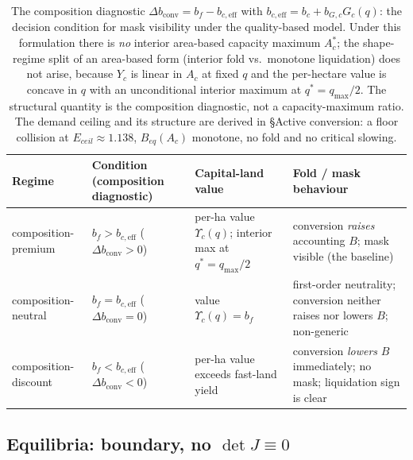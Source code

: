 \documentclass[11pt]{article}
\begin{document}
\begin{table}[htbp]
\centering
\small
\begin{tabularx}{\textwidth}{>{\raggedright\arraybackslash}X>{\raggedright\arraybackslash}X>{\raggedright\arraybackslash}X>{\raggedright\arraybackslash}X}
\toprule
Regime & Condition (composition diagnostic) & Capital-land value & Fold / mask behaviour \\
\midrule
composition-premium & $b_f>b_{c,\mathrm{eff}}$ ($\Delta b_{\mathrm{conv}}>0$) & per-ha value $\Upsilon_c(q)$; interior max at $q^*=q_{\max}/2$ & conversion \emph{raises} accounting $B$; mask visible (the baseline) \\
composition-neutral & $b_f=b_{c,\mathrm{eff}}$ ($\Delta b_{\mathrm{conv}}=0$) & value $\Upsilon_c(q)=b_f$ & first-order neutrality; conversion neither raises nor lowers $B$; non-generic \\
composition-discount & $b_f<b_{c,\mathrm{eff}}$ ($\Delta b_{\mathrm{conv}}<0$) & per-ha value exceeds fast-land yield & conversion \emph{lowers} $B$ immediately; no mask; liquidation sign is clear \\
\bottomrule
\end{tabularx}
\caption{The composition diagnostic $\Delta b_{\mathrm{conv}}=b_f-b_{c,\mathrm{eff}}$ with
$b_{c,\mathrm{eff}}=b_c+b_{G,c}G_c(q)$: the decision condition for mask visibility under the quality-based model.
Under this formulation there is \emph{no} interior area-based capacity maximum
$A_c^*$; the shape-regime split of an area-based form (interior fold vs.\ monotone liquidation) does not arise,
because $Y_c$ is linear in $A_c$ at fixed $q$ and the per-hectare value is concave in $q$ with an
unconditional interior maximum at $q^*=q_{\max}/2$. The structural quantity is the composition diagnostic, not a
capacity-maximum ratio. The demand ceiling and its structure are derived in \S Active conversion: a floor collision at $E_{ceil}\approx1.138$, $B_{eq}(A_c)$ monotone, no fold and no critical slowing.}
\label{tab:regime}
\end{table}

\subsection{Equilibria: boundary, no \texorpdfstring{$\det J\equiv0$}{det J identically zero}}
\end{document}
